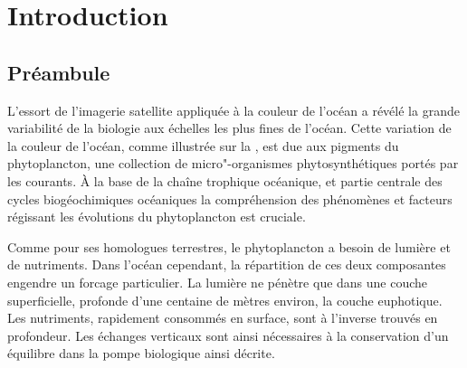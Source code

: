 
\chapter{Introduction}
\addChpLof
\label{chp:introduction}
\graphicspath{{resources/introduction}}

\minitoc%
\clearpage

\begin{figure}[!h]
  \centering
  {%
    \setlength{\fboxsep}{0pt}%
  }%
  \label{fig:oc-illustration}
\end{figure}

\vspace{1\baselineskip}

\section{Préambule}

L'essort de l'imagerie satellite appliquée à la couleur de l'océan  a révélé la grande variabilité de la biologie aux échelles les plus fines de l'océan.
Cette variation de la couleur de l'océan, comme illustrée sur la , est due aux pigments du phytoplancton, une collection de micro"-organismes phytosynthétiques portés par les courants.
À la base de la chaîne trophique océanique, et partie centrale des cycles biogéochimiques océaniques  la compréhension des phénomènes et facteurs régissant les évolutions du phytoplancton est cruciale.

Comme pour ses homologues terrestres, le phytoplancton a besoin de lumière et de nutriments.
Dans l'océan cependant, la répartition de ces deux composantes engendre un forcage particulier.
La lumière ne pénètre que dans une couche superficielle, profonde d'une centaine de mètres environ, la couche euphotique.
Les nutriments, rapidement consommés en surface, sont à l'inverse trouvés en profondeur.
Les échanges verticaux  sont ainsi nécessaires à la conservation d'un équilibre dans la pompe biologique ainsi décrite.

